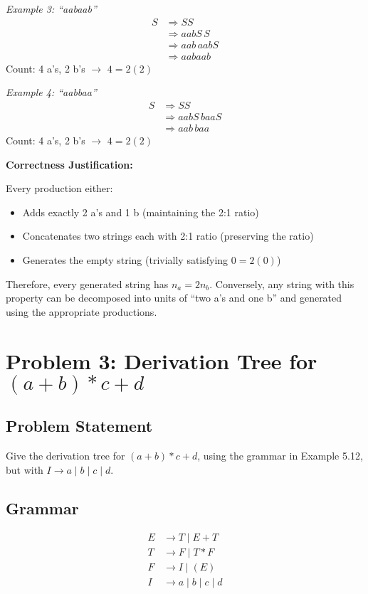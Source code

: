 \documentclass[12pt]{article}
\begin{document}
\textit{Example 3: ``aabaab''}
\begin{align*}
S &\Rightarrow SS \\
  &\Rightarrow aabS \, S \\
  &\Rightarrow aab \, aabS \\
  &\Rightarrow aabaab
\end{align*}
Count: 4 a's, 2 b's $\to$ $4 = 2(2)$ \checkmark

\textit{Example 4: ``aabbaa''}
\begin{align*}
S &\Rightarrow SS \\
  &\Rightarrow aabS \, baaS \\
  &\Rightarrow aab \, baa
\end{align*}
Count: 4 a's, 2 b's $\to$ $4 = 2(2)$ \checkmark

\textbf{Correctness Justification:}

Every production either:
\begin{itemize}
\item Adds exactly 2 a's and 1 b (maintaining the 2:1 ratio)
\item Concatenates two strings each with 2:1 ratio (preserving the ratio)
\item Generates the empty string (trivially satisfying $0 = 2(0)$)
\end{itemize}

Therefore, every generated string has $n_a = 2n_b$. Conversely, any string with this property can be decomposed into units of ``two a's and one b'' and generated using the appropriate productions.


\section{Problem 3: Derivation Tree for $(a + b) * c + d$}

\subsection{Problem Statement}
Give the derivation tree for $(a + b) * c + d$, using the grammar in Example 5.12, but with $I \to a \mid b \mid c \mid d$.

\subsection{Grammar}
\begin{align*}
E &\to T \mid E + T \\
T &\to F \mid T * F \\
F &\to I \mid (E) \\
I &\to a \mid b \mid c \mid d
\end{align*}
\end{document}
